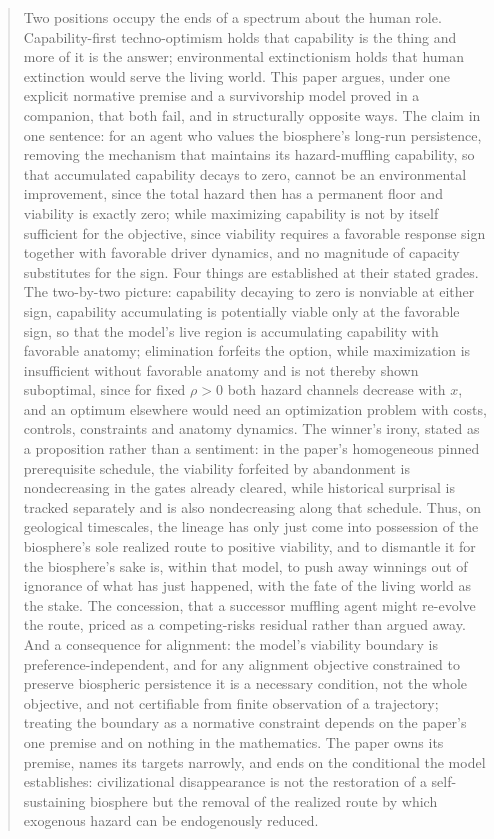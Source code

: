 \begin{abstract}
Two positions occupy the ends of a spectrum about the human role.
Capability-first techno-optimism holds that capability is the thing and
more of it is the answer; environmental extinctionism holds that human
extinction would serve the living world. This paper argues, under one
explicit normative premise and a survivorship model proved in a
companion, that both fail, and in structurally opposite ways. The claim
in one sentence: for an agent who values the biosphere's long-run
persistence, removing the mechanism that maintains its hazard-muffling capability,
so that accumulated capability decays to zero, cannot be an
environmental improvement, since the total hazard then has a permanent
floor and viability is exactly zero; while maximizing capability is not by itself sufficient for the objective, since viability requires a favorable response sign together with favorable driver dynamics, and no magnitude of capacity substitutes for
the sign. Four things are established at their stated grades. The
two-by-two picture: capability decaying to zero is nonviable at either
sign, capability accumulating is potentially viable only at the
favorable sign, so that the model's live region is accumulating capability with favorable anatomy; elimination forfeits the option, while maximization is insufficient without favorable anatomy and is not thereby shown suboptimal, since for fixed $\rho > 0$ both hazard channels decrease with $x$, and an optimum elsewhere would need an optimization problem with costs, controls, constraints and anatomy dynamics. The winner's irony, stated as a proposition rather than a
sentiment: in the paper's homogeneous pinned prerequisite schedule, the
viability forfeited by abandonment is nondecreasing in the gates already
cleared, while historical surprisal is tracked separately and is also
nondecreasing along that schedule. Thus, on geological timescales, the
lineage has only just come into possession of the biosphere's sole
realized route to positive viability, and to dismantle it for the
biosphere's sake is, within that model, to push away winnings out of
ignorance of what has just happened, with the fate of the living world
as the stake. The concession, that a successor muffling agent might
re-evolve the route, priced as a competing-risks residual rather than
argued away. And a consequence for alignment: the model's viability boundary is
preference-independent, and for any alignment objective constrained to
preserve biospheric persistence it is a necessary condition, not the
whole objective, and not certifiable from finite observation of a
trajectory; treating the boundary as a normative constraint depends on
the paper's one premise and on nothing in the mathematics. The paper owns its premise, names its targets
narrowly, and ends on the conditional the model establishes:
civilizational disappearance is not the restoration of a self-sustaining
biosphere but the removal of the realized route by which exogenous
hazard can be endogenously reduced.
\end{abstract}


